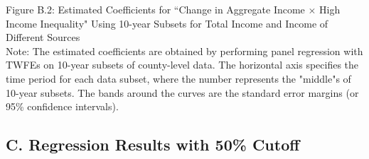 \documentclass{article}
\begin{document}
\pagebreak
\begin{center}
Figure B.2: Estimated Coefficients for ``Change in Aggregate Income $\times$ High Income Inequality" Using 10-year Subsets for Total Income and Income of Different Sources\\
\noindent
{}
Note: The estimated coefficients are obtained by performing panel regression with TWFEs on 10-year subsets of county-level data. The horizontal axis specifies the time period for each data subset, where the number represents the "middle"s of 10-year subsets. The bands around the curves are the standard error margins (or 95\% confidence intervals).
\end{center}


\pagebreak

\subsection*{C. Regression Results with 50\% Cutoff}
\end{document}
